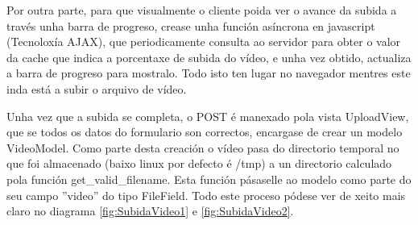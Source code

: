         Por outra parte, para que visualmente o cliente poida ver o avance da subida a través unha
        barra de progreso, crease unha función asíncrona en javascript (Tecnoloxía AJAX), que 
        periodicamente consulta ao servidor para obter o valor da cache que indica a porcentaxe de
        subida do vídeo, e unha vez obtido, actualiza a barra de progreso para mostralo. Todo isto
        ten lugar no navegador mentres este inda está a subir o arquivo de vídeo.

        Unha vez que a subida se completa, o POST é manexado pola vista UploadView, que se todos
        os datos do formulario son correctos, encargase de crear un modelo VideoModel. Como parte
        desta creación o vídeo pasa do directorio temporal no que foi almacenado (baixo linux por 
        defecto é /tmp) a un directorio calculado pola función get\_valid\_filename. Esta función
        pásaselle ao modelo como parte do seu campo ''video'' do tipo FileField. Todo este proceso
        pódese ver de xeito mais claro no diagrama \ref{fig:SubidaVideo1} e \ref{fig:SubidaVideo2}.
        
